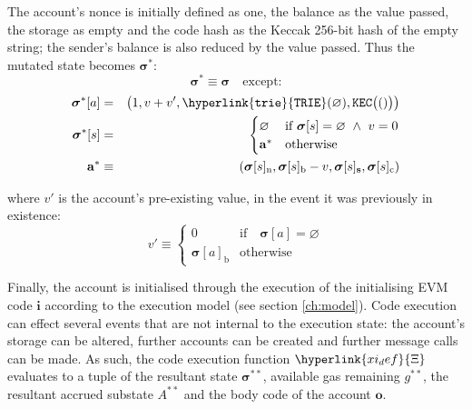 \documentclass[9pt,oneside]{amsart}
\begin{document}
\begin{multicols}{2}
The account's nonce is initially defined as one, the balance as the value passed, the storage as empty and the code hash as the Keccak 256-bit hash of the empty string; the sender's balance is also reduced by the value passed. Thus the mutated state becomes $\boldsymbol{\sigma}^*$:
\begin{equation}
\boldsymbol{\sigma}^* \equiv \boldsymbol{\sigma} \quad \text{except:}
\end{equation}
\begin{eqnarray}
\boldsymbol{\sigma}^*[a] &=& \big( 1, v + v', \mathtt{\hyperlink{trie}{TRIE}}(\varnothing), \mathtt{KEC}\big(()\big) \big) \\
\boldsymbol{\sigma}^*[s] &=& \begin{cases}
\varnothing & \text{if}\ \boldsymbol{\sigma}[s] = \varnothing \ \wedge\ v = 0 \\
\mathbf{a}^* & \text{otherwise}
\end{cases} \\
\mathbf{a}^* &\equiv& (\boldsymbol{\sigma}[s]_{\mathrm{n}}, \boldsymbol{\sigma}[s]_{\mathrm{b}} - v, \boldsymbol{\sigma}[s]_{\mathbf{s}}, \boldsymbol{\sigma}[s]_{\mathrm{c}})
\end{eqnarray}

where $v'$ is the account's pre-existing value, in the event it was previously in existence:
\begin{equation}
v' \equiv \begin{cases}
0 & \text{if} \quad \boldsymbol{\sigma}[a] = \varnothing\\
\boldsymbol{\sigma}[a]_{\mathrm{b}} & \text{otherwise}
\end{cases}
\end{equation}


Finally, the account is initialised through the execution of the initialising EVM code $\mathbf{i}$ according to the execution model (see section \ref{ch:model}).
Code execution can effect several events that are not internal to the execution state: the account's storage can be altered, further accounts can be created and further message calls can be made.
As such, the code execution function $\hyperlink{xi_def}{\Xi}$ evaluates to a tuple of the resultant state $\boldsymbol{\sigma}^{**}$, available gas remaining $g^{**}$, the resultant accrued substate $A^{**}$ and the body code of the account $\mathbf{o}$.


\end{multicols}
\end{document}
